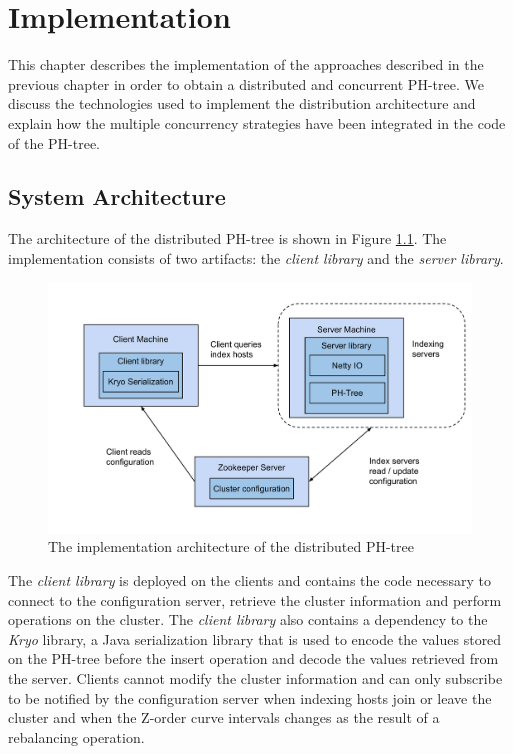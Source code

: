 \documentclass[11pt,a4paper]{globis-book}
\begin{document}
\chapter{Implementation}
\label{ch:implementation}

This chapter describes the implementation of the approaches described in the previous chapter in order to obtain a distributed and concurrent PH-tree. We discuss the technologies used to implement the distribution architecture and explain how the multiple concurrency strategies have been integrated in the code of the PH-tree. 

\section{System Architecture}

The architecture of the distributed PH-tree is shown in Figure \ref{fig:implementation-architecture}. The implementation consists of two artifacts: the \textit{client library} and the \textit{server library}.

\begin{figure}[h]
    \centering 
    \includegraphics[scale=0.4]{images/implementation-architecture}
    \caption{The implementation architecture of the distributed PH-tree}
    \label{fig:implementation-architecture}
\end{figure}

The \textit{client library} is deployed on the clients and contains the code necessary to connect to the configuration server, retrieve the cluster information and perform operations on the cluster. The \textit{client library} also contains a dependency to the \textit{Kryo} library, a Java serialization library that is used to encode the values stored on the PH-tree before the insert operation and decode the values retrieved from the server. Clients cannot modify the cluster information and can only subscribe to be notified by the configuration server when indexing hosts join or leave the cluster and when the Z-order curve intervals changes as the result of a rebalancing operation.
\end{document}
